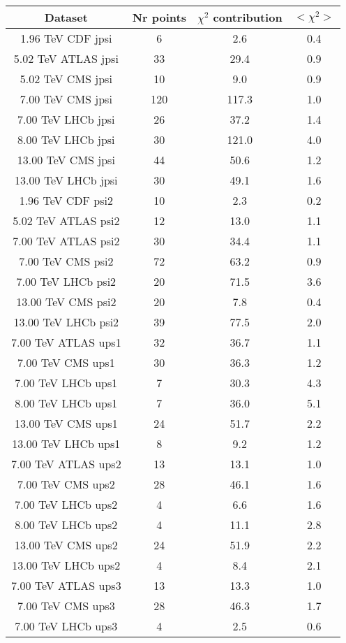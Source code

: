 \begin{table}[h!]
\centering
\begin{tabular}{c|c|c|c}
Dataset & Nr points & $\chi^2$ contribution & $<\chi^2>$ \\
\hline
1.96 TeV CDF jpsi & 6 & 2.6 & 0.4 \\
5.02 TeV ATLAS jpsi & 33 & 29.4 & 0.9 \\
5.02 TeV CMS jpsi & 10 & 9.0 & 0.9 \\
7.00 TeV CMS jpsi & 120 & 117.3 & 1.0 \\
7.00 TeV LHCb jpsi & 26 & 37.2 & 1.4 \\
8.00 TeV LHCb jpsi & 30 & 121.0 & 4.0 \\
13.00 TeV CMS jpsi & 44 & 50.6 & 1.2 \\
13.00 TeV LHCb jpsi & 30 & 49.1 & 1.6 \\
1.96 TeV CDF psi2 & 10 & 2.3 & 0.2 \\
5.02 TeV ATLAS psi2 & 12 & 13.0 & 1.1 \\
7.00 TeV ATLAS psi2 & 30 & 34.4 & 1.1 \\
7.00 TeV CMS psi2 & 72 & 63.2 & 0.9 \\
7.00 TeV LHCb psi2 & 20 & 71.5 & 3.6 \\
13.00 TeV CMS psi2 & 20 & 7.8 & 0.4 \\
13.00 TeV LHCb psi2 & 39 & 77.5 & 2.0 \\
7.00 TeV ATLAS ups1 & 32 & 36.7 & 1.1 \\
7.00 TeV CMS ups1 & 30 & 36.3 & 1.2 \\
7.00 TeV LHCb ups1 & 7 & 30.3 & 4.3 \\
8.00 TeV LHCb ups1 & 7 & 36.0 & 5.1 \\
13.00 TeV CMS ups1 & 24 & 51.7 & 2.2 \\
13.00 TeV LHCb ups1 & 8 & 9.2 & 1.2 \\
7.00 TeV ATLAS ups2 & 13 & 13.1 & 1.0 \\
7.00 TeV CMS ups2 & 28 & 46.1 & 1.6 \\
7.00 TeV LHCb ups2 & 4 & 6.6 & 1.6 \\
8.00 TeV LHCb ups2 & 4 & 11.1 & 2.8 \\
13.00 TeV CMS ups2 & 24 & 51.9 & 2.2 \\
13.00 TeV LHCb ups2 & 4 & 8.4 & 2.1 \\
7.00 TeV ATLAS ups3 & 13 & 13.3 & 1.0 \\
7.00 TeV CMS ups3 & 28 & 46.3 & 1.7 \\
7.00 TeV LHCb ups3 & 4 & 2.5 & 0.6 \\

\end{tabular}
\end{table}
